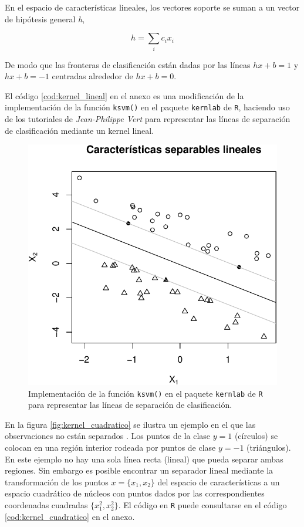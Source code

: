 \documentclass[12pt,spanish,a4paper]{article}
\numberwithin{equation}{section}
\begin{document}
En el espacio de características lineales, los vectores soporte se suman
a un vector de hipótesis general \emph{h},

\begin{equation}
h = \sum_i c_i x_i
\end{equation}

De modo que las fronteras de clasificación están dadas por las líneas
\(hx + b = 1\) y \(hx + b = -1\) centradas alrededor de \(hx + b = 0\).

El código \ref{cod:kernel_lineal} en el anexo es una modificación de la
implementación de la función \texttt{ksvm()} en el paquete
\texttt{kernlab} de \texttt{R}, haciendo uso de los tutoriales de
\emph{Jean-Philippe Vert} para representar las líneas de separación de
clasificación mediante un kernel lineal.

\begin{figure}[h]

{\centering \includegraphics[width=0.8\linewidth]{graphics/svm/kernel_lineal-1} 

}

\caption{Implementación de la función {\tt ksvm()} en el paquete {\tt kernlab} de {\tt R} para representar las líneas de separación de clasificación.}\label{fig:kernel_lineal}
\end{figure}

\clearpage

En la figura \ref{fig:kernel_cuadratico} se ilustra un ejemplo en el que
las observaciones no están separados . Los puntos de la clase \(y = 1\)
(círculos) se colocan en una región interior rodeada por puntos de clase
\(y = -1\) (triángulos). En este ejemplo no hay una sola línea recta
(lineal) que pueda separar ambas regiones. Sin embargo es posible
encontrar un separador lineal mediante la transformación de los puntos
\(x = \{x_1, x_2\}\) del espacio de características a un espacio
cuadrático de núcleos con puntos dados por las correspondientes
coordenadas cuadradas \(\{x_1^2, x_2^2 \}\). El código en \texttt{R}
puede consultarse en el código \ref{cod:kernel_cuadratico} en el anexo.
\end{document}
